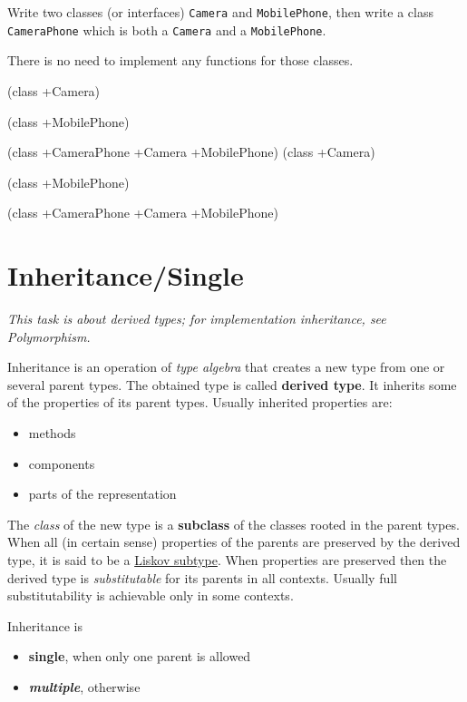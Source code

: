 Write two classes (or interfaces) \texttt{Camera} and
\texttt{MobilePhone}, then write a class \texttt{CameraPhone} which is
both a \texttt{Camera} and a \texttt{MobilePhone}.

There is no need to implement any functions for those classes.

\begin{wideverbatim}

(class +Camera)

(class +MobilePhone)

(class +CameraPhone +Camera +MobilePhone)
(class +Camera)

(class +MobilePhone)

(class +CameraPhone +Camera +MobilePhone)

\end{wideverbatim}

\pagebreak{}
\section*{Inheritance/Single}

\emph{This task is about derived types; for implementation inheritance,
see \emph{Polymorphism}.}

Inheritance is an operation of \emph{type algebra} that creates a new
type from one or several parent types. The obtained type is called
\textbf{derived type}. It inherits some of the properties of its
parent types. Usually inherited properties are:

\begin{itemize}
\item
  methods
\item
  components
\item
  parts of the representation
\end{itemize}

The \emph{class} of the new type is a \textbf{subclass}
of the classes rooted in the parent types. When all (in certain sense)
properties of the parents are preserved by the derived type, it is said
to be a
\href{http://en.wikipedia.org/wiki/Liskov\_substitution\_principle}{Liskov
subtype}. When properties are preserved then the derived type is
\emph{substitutable} for its parents in all contexts. Usually full
substitutability is achievable only in some contexts.

Inheritance is

\begin{itemize}
\item
  \textbf{single}, when only one parent is allowed
\item
  \textbf{\emph{multiple}}, otherwise
\end{itemize}

